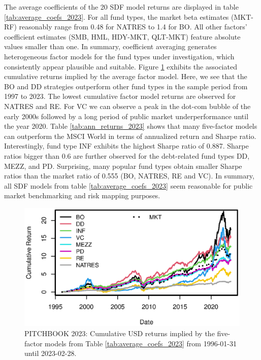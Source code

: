 \documentclass[12pt]{article}
\begin{document}
The average coefficients of the 20 SDF model returns are displayed in table \ref{tab:average_coefs_2023}.
For all fund types, the market beta estimates (MKT-RF) reasonably range from 0.48 for NATRES to 1.4 for BO.
All other factors' coefficient estimates (SMB, HML, HDY-MKT, QLT-MKT) feature absolute values smaller than one.
In summary, coefficient averaging generates heterogeneous factor models for the fund types under investigation, which consistently appear plausible and suitable.
Figure \ref{fig:cum_returns_2023} exhibits the associated cumulative returns implied by the average factor model.
Here, we see that the BO and DD strategies outperform other fund types in the sample period from 1997 to 2023.
The lowest cumulative factor model returns are observed for NATRES and RE.
For VC we can observe a peak in the dot-com bubble of the early 2000s followed by a long period of public market underperformance until the year 2020.
Table \ref{tab:ann_returns_2023} shows that many five-factor models can outperform the MSCI World in terms of annualized return and Sharpe ratio.
Interestingly, fund type INF exhibits the highest Sharpe ratio of 0.887.
Sharpe ratios bigger than 0.6 are further observed for the debt-related fund types DD, MEZZ, and PD.
Surprising, many popular fund types obtain smaller Sharpe ratios than the market ratio of 0.555 (BO, NATRES, RE and VC).
In summary, all SDF models from table \ref{tab:average_coefs_2023} seem reasonable for public market benchmarking and risk mapping purposes.



\begin{figure}[H]
	\centering
	\includegraphics{Figures/Cumulative_Returns_2023_1996.eps}
	\caption{PITCHBOOK 2023: Cumulative USD returns implied by the five-factor models from Table \ref{tab:average_coefs_2023} from 1996-01-31 until 2023-02-28.}
	\label{fig:cum_returns_2023}   
\end{figure}
\end{document}
